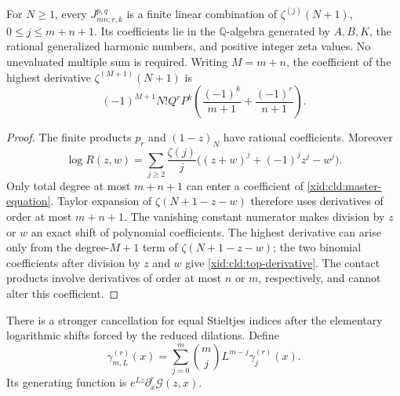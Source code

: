 \begin{corollary}
For $N\ge1$, every $J_{mn;r,k}^{p,q}$ is a finite linear combination of
$\zeta^{(j)}(N+1)$, $0\le j\le m+n+1$.  Its coefficients lie in the
$\mathbb Q$-algebra generated by $A,B,K$, the rational generalized
harmonic numbers, and positive integer zeta values.  No unevaluated
multiple sum is required.  Writing $M=m+n$, the coefficient of the
highest derivative $\zeta^{(M+1)}(N+1)$ is
\begin{equation}
 (-1)^{M+1}N!Q^rP^k
       \left(\frac{(-1)^k}{m+1}+\frac{(-1)^r}{n+1}\right).
 \label{xid:cld:top-derivative}
\end{equation}
\end{corollary}
\begin{proof}
The finite products $p_r$ and $(1-z)_N$ have rational coefficients.
Moreover
\begin{equation}
 \log R(z,w)=\sum_{j\ge2}\frac{\zeta(j)}j
       \bigl((z+w)^j+(-1)^jz^j-w^j\bigr).
 \label{xid:cld:logR}
\end{equation}
Only total degree at most $m+n+1$ can enter a coefficient of
\eqref{xid:cld:master-equation}.  Taylor expansion of $\zeta(N+1-z-w)$
therefore uses derivatives of order at most $m+n+1$.  The vanishing
constant numerator makes division by $z$ or $w$ an exact shift of
polynomial coefficients.  The highest derivative can arise only from
the degree-$M+1$ term of $\zeta(N+1-z-w)$; the two binomial
coefficients after division by $z$ and $w$ give
\eqref{xid:cld:top-derivative}.  The contact products involve derivatives of
order at most $n$ or $m$, respectively, and cannot alter this coefficient.
\end{proof}

There is a stronger cancellation for equal Stieltjes indices after the
elementary logarithmic shifts forced by the reduced dilations.  Define
\[
 \gamma_{m,L}^{(r)}(x)=\sum_{j=0}^m\binom mj L^{m-j}
                                      \gamma_j^{(r)}(x).
\]
Its generating function is $e^{Lz}\partial_x^r\mathscr G(z,x)$.

